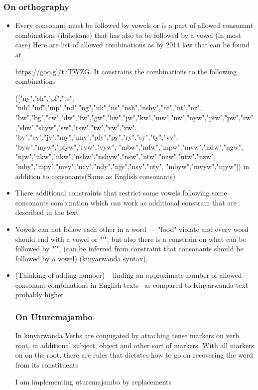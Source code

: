\documentclass[10pt,a4paper]{article}
\begin{document}
\subsubsection{On orthography}
\begin{itemize}
	\item Every consonant must be followed by vowels or is a part of allowed consonant combinations (ibihekane) that has also to be followed by a vowel (in most case)
	Here are list of allowed combinations  as by 2014 law that can be found at
	
	 \url{https://goo.gl/t7TWZG}. It constrains the combinations to the following combinations
	 
	(["ny","sh","pf","ts",
	"mb","mf","mp","nd","ng","nk","ns","nsh","nshy","nt","nt","nz",
	"bw","bg","cw","dw","fw","gw","hw","jw","kw","mw","nw","nyw","pfw","pw","rw","shw","shyw","sw","tsw","tw","vw","zw",
	"by","cy","jy","my","nny","pfy","py","ry","sy","ty","vy",
	"byw","myw","pfyw","ryw","vyw",
	"mbw","mfw","mpw","mvw","ndw","ngw",
	"njw","nkw","nkw","nshw","nshyw","nsw","ntw","nzw","ntw","nzw",
	"mby","mpy","mvy","ncy","ndy","njy","nsy","nty",
	"mbyw","mvyw","njyw"]) in addition to consonants(Same as English consonants)
	
	\item There additional constraints that restrict some vowels following some consonants combination which can work as additional constrain  that are described in the text
	\item  Vowels can not follow each other in a word --- "food" violate and every word should end with a vowel or "'", but also there is a constrain on what can be followed by "'", (can be inferred from constraint that consonants should be followed by a vowel) (kinyarwanda syntax), 
	
	\item (Thinking of adding number) -- finding an approximate number of allowed consonant combinations in English texts --as compared to Kinyarwanda text --probably higher
	

	
	
	\subsubsection{On Uturemajambo}
In kinyarwanda Verbs are conjugated by attaching tense markers on verb root, in additional subject, object and other sort of markers. With all markers on on the root, there are rules that dictates how to go on recovering the word from its constituents	

I am implementing uturemajambo by replacements
	
\end{itemize}
\end{document}
